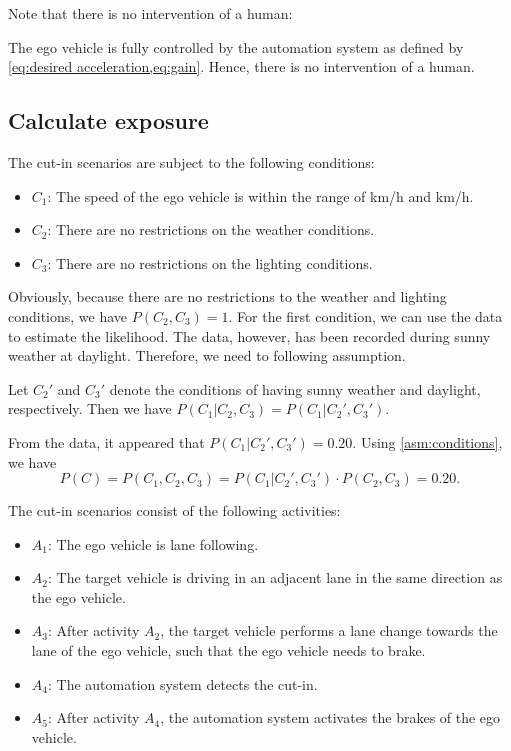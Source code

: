 Note that there is no intervention of a human:
\begin{assumption}
	The ego vehicle is fully controlled by the automation system as defined by \cref{eq:desired acceleration,eq:gain}. Hence, there is no intervention of a human.
\end{assumption}



\subsection{Calculate exposure}
\label{sec:example exposure}

The cut-in scenarios are subject to the following conditions:
\begin{itemize}
	\item $C_1$: The speed of the ego vehicle is within the range of \unit[60]{km/h} and \unit[130]{km/h}.
	\item $C_2$: There are no restrictions on the weather conditions.
	\item $C_3$: There are no restrictions on the lighting conditions.
\end{itemize}

Obviously, because there are no restrictions to the weather and lighting conditions, we have $P(C_2,C_3)=1$. For the first condition, we can use the data to estimate the likelihood. The data, however, has been recorded during sunny weather at daylight. Therefore, we need to following assumption.

\begin{assumption} \label{asm:conditions}
	Let $C_2'$ and $C_3'$ denote the conditions of having sunny weather and daylight, respectively. Then we have $P(C_1|C_2,C_3)=P(C_1|C_2',C_3')$.
\end{assumption}

From the data, it appeared that $P(C_1|C_2',C_3')=0.20$. Using \cref{asm:conditions}, we have
\begin{dmath}
	P(C) = P(C_1,C_2,C_3)=P(C_1|C_2',C_3')\cdot P(C_2,C_3)=0.20.
\end{dmath}

The cut-in scenarios consist of the following activities:
\begin{itemize}
	\item $A_1$: The ego vehicle is lane following.
	\item $A_2$: The target vehicle is driving in an adjacent lane in the same direction as the ego vehicle.
	\item $A_3$: After activity $A_2$, the target vehicle performs a lane change towards the lane of the ego vehicle, such that the ego vehicle needs to brake.
	\item $A_4$: The automation system detects the cut-in.
	\item $A_5$: After activity $A_4$, the automation system activates the brakes of the ego vehicle.
\end{itemize}

